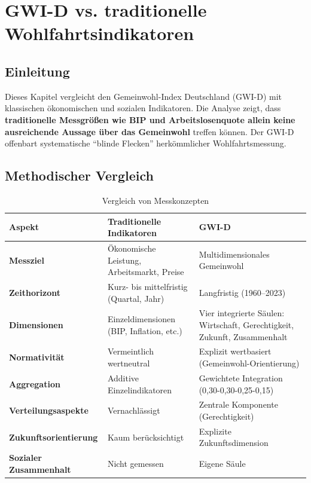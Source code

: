 \chapter{GWI-D vs. traditionelle Wohlfahrtsindikatoren}
\label{chap:gwi_vs_traditionell}

\section*{Einleitung}
Dieses Kapitel vergleicht den Gemeinwohl-Index Deutschland (GWI-D) mit klassischen ökonomischen und sozialen Indikatoren. Die Analyse zeigt, dass \textbf{traditionelle Messgrößen wie BIP und Arbeitslosenquote allein keine ausreichende Aussage über das Gemeinwohl} treffen können. Der GWI-D offenbart systematische \enquote{blinde Flecken} herkömmlicher Wohlfahrtsmessung.

\section{Methodischer Vergleich}

\begin{table}[ht]
    \centering
    \caption{Vergleich von Messkonzepten}
    \label{tab:methoden_vergleich}
    \begin{tabular}{lp{5cm}p{5cm}}
        \toprule
        \textbf{Aspekt} & \textbf{Traditionelle Indikatoren} & \textbf{GWI-D} \\
        \midrule
        \textbf{Messziel} & Ökonomische Leistung, Arbeitsmarkt, Preise & Multidimensionales Gemeinwohl \\
        \textbf{Zeithorizont} & Kurz- bis mittelfristig (Quartal, Jahr) & Langfristig (1960–2023) \\
        \textbf{Dimensionen} & Einzeldimensionen (BIP, Inflation, etc.) & Vier integrierte Säulen: Wirtschaft, Gerechtigkeit, Zukunft, Zusammenhalt \\
        \textbf{Normativität} & Vermeintlich wertneutral & Explizit wertbasiert (Gemeinwohl-Orientierung) \\
        \textbf{Aggregation} & Additive Einzelindikatoren & Gewichtete Integration (0,30-0,30-0,25-0,15) \\
        \textbf{Verteilungsaspekte} & Vernachlässigt & Zentrale Komponente (Gerechtigkeit) \\
        \textbf{Zukunftsorientierung} & Kaum berücksichtigt & Explizite Zukunftsdimension \\
        \textbf{Sozialer Zusammenhalt} & Nicht gemessen & Eigene Säule \\
        \bottomrule
    \end{tabular}
\end{table}

